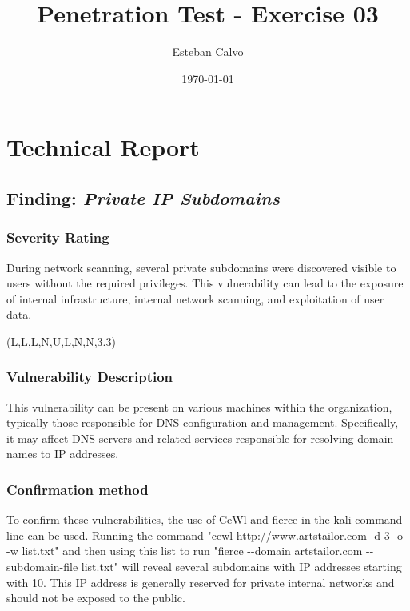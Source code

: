 \documentclass[notitlepage]{article}
\begin{document}
  
\title{Penetration Test - Exercise 03}
\author{Esteban Calvo}
\date{\isodate\today}

\maketitle

\tableofcontents

\newpage

\section{Technical Report}

  \subsection{Finding: \emph{Private IP Subdomains}}
  
	\subsubsection*{Severity Rating}
	    During network scanning, several private subdomains were discovered visible to users without
            the required privileges. This vulnerability can lead to the exposure of internal infrastructure, internal network scanning, and exploitation of user data.
            
		\cvss(L,L,L,N,U,L,N,N,3.3)
		
  	\subsubsection*{Vulnerability Description}
            This vulnerability can be present on various machines within the organization, typically those responsible for DNS configuration and management. Specifically, it may affect DNS servers and related services responsible for resolving domain names to IP addresses.
  		
  	\subsubsection*{Confirmation method}
            To confirm these vulnerabilities, the use of CeWl and fierce in the kali command line can be used. Running the command "cewl http://www.artstailor.com -d 3 -o -w list.txt" and then using this list to run "fierce -{}-domain artstailor.com -{}-subdomain-file list.txt" will reveal several subdomains with IP addresses starting with 10. This IP address is generally reserved for private internal networks and should not be exposed to the  public.
		
\end{document}
